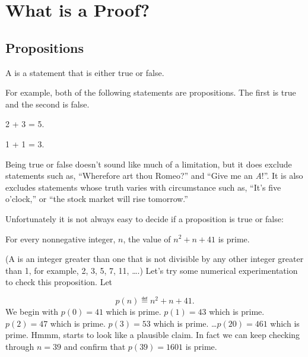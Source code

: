 \chapter{What is a Proof?}\label{proofs_chap}

\section{Propositions}\label{prop_sec}

\begin{definition*}
  A  is a statement that is either true or false.
\end{definition*}

For example, both of the following statements are propositions.  The
first is true and the second is false.
\begin{proposition}
2 + 3 = 5.
\end{proposition}
\begin{proposition}
1 + 1 = 3.
\end{proposition}

Being true or false doesn't sound like much of a limitation, but it does
exclude statements such as, ``Wherefore art thou Romeo?'' and ``Give me an
\emph{A}!''.  It is also excludes statements whose truth varies with
circumstance such as, ``It's five o'clock,'' or ``the stock market will
rise tomorrow.''

\iffalse
Being ``mathematical'' is a more serious restriction.  For example,
``Albert's wife's name is `Irene'~'' is a true statement, and you
could prove it by presenting legal documents and the testimony of
their children.  But it isn't a proposition because it is not a
\emph{mathematical} statement.  There is no mathematical definition of
Albert or Irene, and statements about them are not part of
mathematics.  Propositions must be about well-defined mathematical
objects like numbers, sets, functions, relations, \etc, and they must
be stated using mathematically precise language.  We can illustrate
this with a few examples.
\fi

Unfortunately it is not always easy to decide if a proposition is true
or false:
\begin{proposition}\label{41form}
For every nonnegative integer, $n$, the value of $n^2 + n + 41$ is prime.
\end{proposition}
(A  is an integer greater than one that is not divisible by
any other integer greater than 1, for example, 2, 3, 5, 7, 11, \dots.)
Let's try some numerical experimentation to check this proposition.
Let
\begin{equation}\label{pn41}
p(n) \eqdef  n^2 + n + 41.
\end{equation}
We begin with $p(0) = 41$ which is prime.  $p(1) = 43$ which is prime.  $p(2) = 47$
which is prime.  $p(3)=53$ which is prime. \dots $p(20) = 461$ which is
prime.  Hmmm, starts to look like a plausible claim.  In fact we can keep
checking through $n=39$ and confirm that $p(39)=1601$ is prime.

